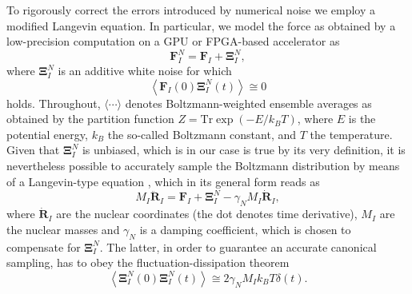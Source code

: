 \documentclass[format=acmsmall,review,timestamp,urlbreakonhyphens]{acmart}
\begin{document}
To rigorously correct the errors introduced by numerical noise we employ a modified Langevin equation. In particular, we model the force as obtained by a low-precision computation on a GPU or FPGA-based accelerator as
\begin{equation} \label{fFPGA}
\textbf{F}_{I}^{N} = \textbf{F}_{I} + \mathbf{\Xi }_{I}^{N},
\end{equation}
where $\mathbf{\Xi }_{I}^{N}$ is an additive white noise for which
\begin{equation} \label{CrossCorr}
 \left \langle \textbf{F}_{I}\left ( 0 \right ) \mathbf{\Xi } _{I}^{N}\left ( t \right )\right \rangle \cong  0
\end{equation}
holds. Throughout, $\langle \cdots \rangle$ denotes Boltzmann-weighted ensemble averages as obtained by the partition function $Z=\text{Tr} \exp(-E/k_B T)$, where $E$ is the potential energy, $k_B$ the so-called Boltzmann constant, and $T$ the temperature. Given that $\mathbf{\Xi }_{I}^{N}$ is unbiased, which is in our case is true by its very definition, it is nevertheless possible to accurately sample the Boltzmann distribution by means of a Langevin-type equation \cite{Krajewski,Richters,Karhan}, which in its general form reads as
\begin{equation} \label{LangevinEq}
M_{I}\ddot{\textbf{R}}_{I}=\textbf{F}_{I}+\mathbf{\Xi }_{I}^{N}-\gamma _{N}M_{I}\dot{\textbf{R}}_{I},
\end{equation}
where $\dot{\textbf{R}}_{I}$ are the nuclear coordinates (the dot denotes time derivative), $M_I$ are the nuclear masses and $\gamma _{N}$ is a damping coefficient,
which is chosen to compensate for \(\mathbf{\Xi }_{I}^{N}\). The latter, in order to guarantee an accurate canonical sampling, has to obey
the fluctuation-dissipation theorem
\begin{equation}
\left \langle \mathbf{\Xi }_{I}^{N}\left ( 0 \right ) \mathbf{\Xi }_{I}^{N}\left ( t \right ) \right \rangle \cong  2 \gamma_{N} M_I k_{B} T  \delta \left ( t \right ).
\label{FDT}
\end{equation}
\end{document}
